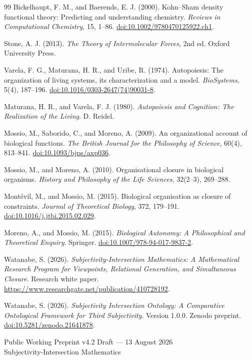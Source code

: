 \documentclass[11pt,a4paper]{article}
\begin{document}
\begin{thebibliography}{99}
Bickelhaupt, F. M., and Baerends, E. J. (2000). Kohn--Sham density functional theory: Predicting and understanding chemistry. \emph{Reviews in Computational Chemistry}, 15, 1--86. \href{https://doi.org/10.1002/9780470125922.ch1}{doi:10.1002/9780470125922.ch1}.

Stone, A. J. (2013). \emph{The Theory of Intermolecular Forces}, 2nd ed. Oxford University Press.

Varela, F. G., Maturana, H. R., and Uribe, R. (1974). Autopoiesis: The organization of living systems, its characterization and a model. \emph{BioSystems}, 5(4), 187--196. \href{https://doi.org/10.1016/0303-2647(74)90031-8}{doi:10.1016/0303-2647(74)90031-8}.

Maturana, H. R., and Varela, F. J. (1980). \emph{Autopoiesis and Cognition: The Realization of the Living}. D. Reidel.

Mossio, M., Saborido, C., and Moreno, A. (2009). An organizational account of biological functions. \emph{The British Journal for the Philosophy of Science}, 60(4), 813--841. \href{https://doi.org/10.1093/bjps/axp036}{doi:10.1093/bjps/axp036}.

Mossio, M., and Moreno, A. (2010). Organisational closure in biological organisms. \emph{History and Philosophy of the Life Sciences}, 32(2--3), 269--288.

Mont\'evil, M., and Mossio, M. (2015). Biological organisation as closure of constraints. \emph{Journal of Theoretical Biology}, 372, 179--191. \href{https://doi.org/10.1016/j.jtbi.2015.02.029}{doi:10.1016/j.jtbi.2015.02.029}.

Moreno, A., and Mossio, M. (2015). \emph{Biological Autonomy: A Philosophical and Theoretical Enquiry}. Springer. \href{https://doi.org/10.1007/978-94-017-9837-2}{doi:10.1007/978-94-017-9837-2}.

Watanabe, S. (2026). \emph{Subjectivity-Intersection Mathematics: A Mathematical Research Program for Viewpoints, Relational Generation, and Simultaneous Closure}. Research white paper. \url{https://www.researchgate.net/publication/410728192}.

Watanabe, S. (2026). \emph{Subjectivity Intersection Ontology: A Comparative Ontological Framework for Third Subjectivity}. Version 1.0.0. Zenodo preprint. \href{https://doi.org/10.5281/zenodo.21641878}{doi:10.5281/zenodo.21641878}.

\end{thebibliography}

\vfill
\begin{center}
\small\sffamily
Public Working Preprint v4.2 Draft --- 13 August 2026\\
Subjectivity-Intersection Mathematics
\end{center}
\end{document}
